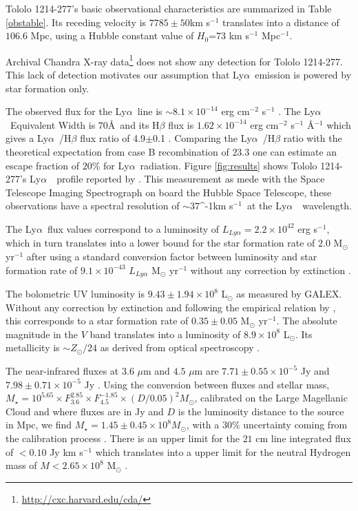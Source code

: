 \documentclass[a4paper,fleqn,usenatbib]{mnras}
\newcommand{\tol}{Tololo 1214-277}
\newcommand{\lya}{\ifmmode{{\rm Ly}\alpha}\else Ly$\alpha$\ \fi}
\newcommand{\kms}{\ifmmode\mathrm{km\ s}^{-1}\else km s$^{-1}$\fi}
\begin{document}
\tol's basic observational characteristics are summarized in Table \ref{obstable}.
Its receding velocity is $7785\pm 50$km s$^{-1}$ translates
into a distance of $106.6$ Mpc, using a Hubble constant value of $H_{0}$=73
km s$^{-1}$ Mpc$^{-1}$.

Archival Chandra X-ray data\footnote{\url{http://cxc.harvard.edu/cda/}} does not show any
detection for \tol. 
This lack of detection motivates our assumption that \lya emission is
powered by star formation only.

The observed flux for the \lya line is $\sim
8.1\times 10^{-14}$ erg cm$^{-2}$ s$^{-1}$ \citep{Thuan97}.
The \lya Equivalent Width is $70$\AA\ and its H$\beta$ flux is 
$1.62\times 10^{-14}$ erg cm$^{-2}$ s$^{-1}$ \AA$^{-1}$
which gives a \lya/H$\beta$ flux ratio of
4.9$\pm$0.1 \citep{Izotov04}.
Comparing the \lya/H$\beta$ ratio with the theoretical
expectation from case B recombination of $23.3$ \citep{Hummer1987} one
can estimate an escape fraction of $20$\% for \lya radiation.
Figure \ref{fig:results} shows \tol's \lya\ profile reported by
\cite{mashesse03}. This measurement as mede with the Space Telescope
Imaging Spectrograph on board the Hubble Space Telescope, these
observations have a spectral resolution of $\sim 37$\kms\ at the
\lya\ wavelength.  

The \lya flux values correspond to a luminosity of
$L_{Ly\alpha}=2.2\times 10^{42}$ erg s$^{-1}$, which in turn
translates  into a lower bound for the star formation rate of $2.0$
M$_{\odot}$ yr$^{-1}$ after using a standard conversion factor between
luminosity and star formation rate of $9.1\times 10^{-43}$
$L_{Ly\alpha}$ M$_{\odot}$ yr$^{-1}$ 
without any
correction by extinction
\citep{Kennicutt98}.


The bolometric UV luminosity is $9.43\pm1.94 \times 10^{8}$
L$_{\odot}$ as measured by GALEX. Without any correction by extinction
and following the empirical relation by \cite{Kennicutt98}, this
corresponds to a star formation rate of $0.35\pm 0.05$ M$_{\odot}$
yr$^{-1}$. 
The absolute magnitude in the $V$ band translates into a luminosity of
$8.9\times 10^{8}$ L$_{\odot}$.  
Its metallicity is $\sim Z_{\odot}/24$ as derived from
optical spectroscopy \citep{Izotov04}. 
%

The near-infrared fluxes at $3.6$ $\mu$m and $4.5$ $\mu$m are
$7.71\pm0.55\times 10^{-5}$ Jy and $7.98\pm0.71\times 10^{-5}$ Jy
\citep{2008ApJ...678..804E}.
Using the conversion between fluxes and
stellar mass, $M_{\star} =
10^{5.65} \times F_{3.6}^{2.85} \times F_{4.5}^{-1.85} \times
(D/0.05)^2 M_{\odot}$,  calibrated on the Large Magellanic Cloud 
and  where fluxes are in Jy and $D$ is the luminosity
distance to the source in Mpc, we find $M_{\star} = 1.45\pm0.45\times 10^{8}
M_{\odot}$, with a $30\%$ uncertainty coming from the calibration
process \citep{2012AJ....143..139E}.  
There is an upper limit for the  $21$ cm line integrated flux of $<0.10$
Jy km s$^{-1}$  which translates into a upper limit for the neutral
Hydrogen mass of $M<2.65\times 10^{8}$ M$_{\odot}$
\citep{pustilnikmartin07}. 
\end{document}
